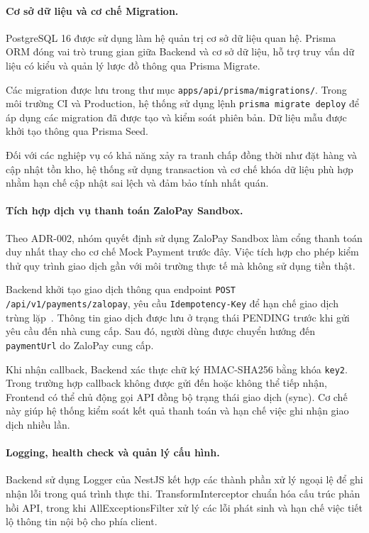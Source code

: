 \paragraph{Cơ sở dữ liệu và cơ chế Migration.}

PostgreSQL 16 được sử dụng làm hệ quản trị cơ sở dữ liệu quan hệ. Prisma ORM đóng vai trò trung gian giữa Backend và cơ sở dữ liệu, hỗ trợ truy vấn dữ liệu có kiểu và quản lý lược đồ thông qua Prisma Migrate.

Các migration được lưu trong thư mục \texttt{apps/api/prisma/migrations/}. Trong môi trường CI và Production, hệ thống sử dụng lệnh \texttt{prisma migrate deploy} để áp dụng các migration đã được tạo và kiểm soát phiên bản. Dữ liệu mẫu được khởi tạo thông qua Prisma Seed.

Đối với các nghiệp vụ có khả năng xảy ra tranh chấp đồng thời như đặt hàng và cập nhật tồn kho, hệ thống sử dụng transaction và cơ chế khóa dữ liệu phù hợp nhằm hạn chế cập nhật sai lệch và đảm bảo tính nhất quán.

\paragraph{Tích hợp dịch vụ thanh toán ZaloPay Sandbox.}

Theo ADR-002, nhóm quyết định sử dụng ZaloPay Sandbox làm cổng thanh toán duy nhất thay cho cơ chế Mock Payment trước đây. Việc tích hợp cho phép kiểm thử quy trình giao dịch gần với môi trường thực tế mà không sử dụng tiền thật.

Backend khởi tạo giao dịch thông qua endpoint \texttt{POST /api/v1/payments/zalopay}, yêu cầu \texttt{Idempotency-Key} để hạn chế giao dịch trùng lặp~\cite{zalopay}. Thông tin giao dịch được lưu ở trạng thái PENDING trước khi gửi yêu cầu đến nhà cung cấp. Sau đó, người dùng được chuyển hướng đến \texttt{paymentUrl} do ZaloPay cung cấp.

Khi nhận callback, Backend xác thực chữ ký HMAC-SHA256 bằng khóa \texttt{key2}. Trong trường hợp callback không được gửi đến hoặc không thể tiếp nhận, Frontend có thể chủ động gọi API đồng bộ trạng thái giao dịch (sync). Cơ chế này giúp hệ thống kiểm soát kết quả thanh toán và hạn chế việc ghi nhận giao dịch nhiều lần.

\paragraph{Logging, health check và quản lý cấu hình.}

Backend sử dụng Logger của NestJS kết hợp các thành phần xử lý ngoại lệ để ghi nhận lỗi trong quá trình thực thi. TransformInterceptor chuẩn hóa cấu trúc phản hồi API, trong khi AllExceptionsFilter xử lý các lỗi phát sinh và hạn chế việc tiết lộ thông tin nội bộ cho phía client.

